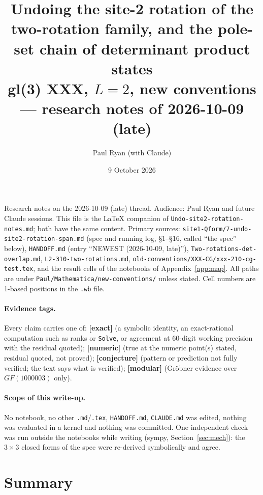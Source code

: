 \documentclass[11pt]{article}
\title{Undoing the site-2 rotation of the two-rotation family, and the pole-set chain of determinant product states\\[2pt]\large gl(3) XXX, $L=2$, new conventions --- research notes of 2026-10-09 (late)}
\author{Paul Ryan (with Claude)}
\date{9 October 2026}
\newcommand{\ex}{\textbf{[exact]}}
\newcommand{\nm}{\textbf{[numeric]}}
\newcommand{\cj}{\textbf{[conjecture]}}
\newcommand{\md}{\textbf{[modular]}}
\newcommand{\nb}[1]{\texttt{#1}}
\begin{document}
\maketitle

\noindent Research notes on the 2026-10-09 (late) thread. Audience: Paul Ryan and future Claude sessions. This file is the \LaTeX{} companion of \nb{Undo-site2-rotation-notes.md}; both have the same content. Primary sources: \nb{site1-Qform/7-undo-site2-rotation-span.md} (spec and running log, \S1--\S16, called ``the spec'' below), \nb{HANDOFF.md} (entry ``NEWEST (2026-10-09, late)''), \nb{Two-rotations-det-overlap.md}, \nb{L2-310-two-rotations.md}, \nb{old-conventions/XXX-CG/xxx-210-cg-test.tex}, and the result cells of the notebooks of Appendix~\ref{app:map}. All paths are under \nb{Paul/Mathematica/new-conventions/} unless stated. Cell numbers are 1-based positions in the \nb{.wb} file.

\paragraph{Evidence tags.} Every claim carries one of: \ex{} (a symbolic identity, an exact-rational computation such as ranks or \texttt{Solve}, or agreement at 60-digit working precision with the residual quoted); \nm{} (true at the numeric point(s) stated, residual quoted, not proved); \cj{} (pattern or prediction not fully verified; the text says what is verified); \md{} (Gr\"obner evidence over $GF(1000003)$ only).

\paragraph{Scope of this write-up.} No notebook, no other \nb{.md}/\nb{.tex}, \nb{HANDOFF.md}, \nb{CLAUDE.md} was edited, nothing was evaluated in a kernel and nothing was committed. One independent check was run outside the notebooks while writing (sympy, Section~\ref{sec:mech}): the $3\times3$ closed forms of the spec were re-derived symbolically and agree.

\tableofcontents

\section{Summary}\label{sec:summary}
\end{document}
